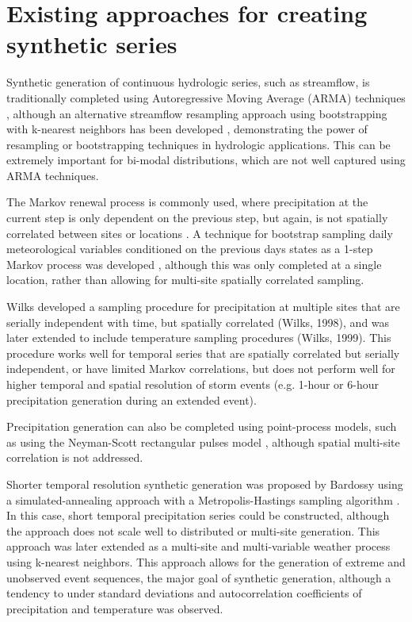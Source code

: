 \documentclass[11pt]{article} %
\begin{document}
\section{Existing approaches for creating synthetic series}

Synthetic generation of continuous hydrologic series, such as streamflow, is traditionally completed using Autoregressive Moving Average (ARMA) techniques \cite{Salas1980}, although an alternative streamflow resampling approach using bootstrapping with k-nearest neighbors has been developed \cite{Lall1996}, demonstrating the power of resampling or bootstrapping techniques \cite{Efron1998} in hydrologic applications. This can be extremely important for bi-modal distributions, which are not well captured using ARMA techniques.

The Markov renewal process is commonly used, where precipitation at the current step is only dependent on the previous step, but again, is not spatially correlated between sites or locations \cite{Foufoula-Georgiou1987}. A technique for bootstrap sampling daily meteorological variables conditioned on the previous days states as a 1-step Markov process was developed \cite{Rajagopalan1999}, although this was only completed at a single location, rather than allowing for multi-site spatially correlated sampling.

Wilks developed a sampling procedure for precipitation at multiple sites that are serially independent with time, but spatially correlated (Wilks, 1998), and was later extended to include temperature sampling procedures (Wilks, 1999). This procedure works well for temporal series that are spatially correlated but serially independent, or have limited Markov correlations, but does not perform well for higher temporal and spatial resolution of storm events (e.g. 1-hour or 6-hour precipitation generation during an extended event). 

Precipitation generation can also be completed using point-process models, such as using the Neyman-Scott rectangular pulses model \cite{Rod-Iturbe1987}, although spatial multi-site correlation is not addressed.

Shorter temporal resolution synthetic generation was proposed by Bardossy using a simulated-annealing approach with a Metropolis-Hastings sampling algorithm \cite{Bardossy1998}. In this case, short temporal precipitation series could be constructed, although the approach does not scale well to distributed or multi-site generation. This approach was later extended as a multi-site and multi-variable weather process \cite{Buishand2001} using k-nearest neighbors. This approach allows for the generation of extreme and unobserved event sequences, the major goal of synthetic generation, although a tendency to under standard deviations and autocorrelation coefficients of precipitation and temperature was observed. 
\end{document}
